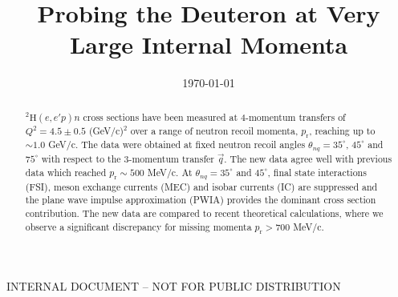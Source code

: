 \documentclass[aps,prl,twocolumn,showpacs,superscriptaddress,groupedaddress]{revtex4-2}  %
\begin{document}
\widetext
{}
\centerline{INTERNAL DOCUMENT -- NOT FOR PUBLIC DISTRIBUTION}


\title{Probing the Deuteron at Very Large Internal Momenta}



\date{\today}


\begin{abstract}
  $^{2}\mathrm{H}(e,e'p)n$ cross sections have been measured at 4-momentum transfers of $Q^{2} = 4.5 \pm 0.5$ (GeV/c)$^{2}$
  over a range of neutron recoil momenta, $p_{\mathrm{r}}$,  reaching up to $\sim1.0$ GeV/c. The data were
  obtained at fixed neutron recoil angles $\theta_{nq} = 35^\circ$, $45^\circ$ and $75^{\circ}$  with respect to the 3-momentum
  transfer $\vec q$. The new data agree well with previous data which reached $p_{\mathrm{r}}\sim500$ MeV/c. At $\theta_{nq} = 35^\circ$
  and $45^\circ$, final state interactions (FSI), meson exchange currents (MEC) and isobar currents (IC) are suppressed and
  the plane wave impulse approximation (PWIA) provides the dominant cross section contribution. The new data are compared to recent
  theoretical calculations, where we observe a significant discrepancy for missing momenta $p_{\mathrm{r}}>700$ MeV/c. 
\end{abstract}

\pacs{}
\maketitle

\end{document}
